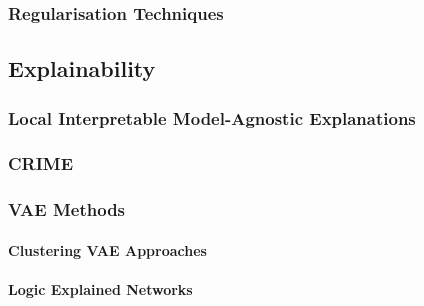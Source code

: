 \subsubsection{Regularisation Techniques}

\subsection{Explainability}
\subsubsection{Local Interpretable Model-Agnostic Explanations}
\subsubsection{CRIME}
\subsubsection{VAE Methods}
\paragraph{Clustering VAE Approaches}
\paragraph{Logic Explained Networks}